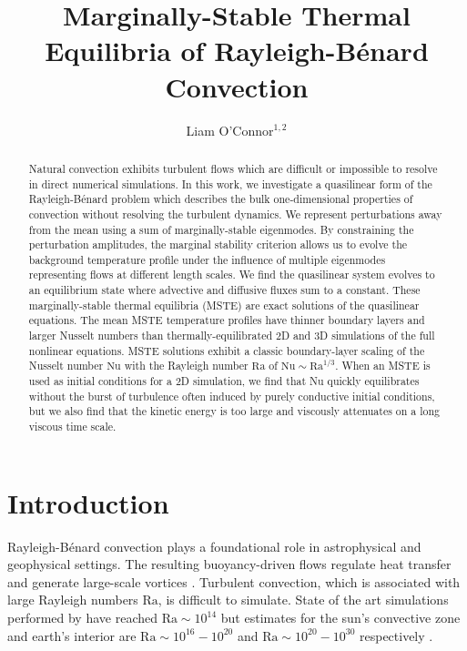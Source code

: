 \documentclass[longbibliography,twocolumn,amsmath,amssymb,aps,nofootinbib]{revtex4-2}
\newcommand\Ra{\mathrm{Ra}}
\newcommand\Nu{\mathrm{Nu}}
\begin{document}
\title{Marginally-Stable Thermal Equilibria of Rayleigh-B\'enard Convection}

\author{Liam O'Connor$^{1,2}$}

\begin{abstract}
    Natural convection exhibits turbulent flows which are difficult or impossible to resolve in direct numerical simulations. In this work, we investigate a quasilinear form of the Rayleigh-B\'enard problem which describes the bulk one-dimensional properties of convection without resolving the turbulent dynamics. We represent perturbations away from the mean using a sum of marginally-stable eigenmodes.  By constraining the perturbation amplitudes, the marginal stability criterion allows us to evolve the background temperature profile under the influence of multiple eigenmodes representing flows at different length scales.
    We find the quasilinear system evolves to an equilibrium state where advective and diffusive fluxes sum to a constant.
    These marginally-stable thermal equilibria (MSTE) are exact solutions of the quasilinear equations.
    The mean MSTE temperature profiles have thinner boundary layers and larger Nusselt numbers than thermally-equilibrated 2D and 3D simulations of the full nonlinear equations.  
    MSTE solutions exhibit a classic boundary-layer scaling of the Nusselt number $\Nu$ with the Rayleigh number $\Ra$ of $\Nu \sim \Ra^{1/3}$.
    When an MSTE is used as initial conditions for a 2D simulation, we find that Nu quickly equilibrates without the burst of turbulence often induced by purely conductive initial conditions, but we also find that the kinetic energy is too large and viscously attenuates on a long viscous time scale.
\end{abstract}

\maketitle

\section{Introduction}
Rayleigh-B\'enard convection plays a foundational role in astrophysical and geophysical settings.
The resulting buoyancy-driven flows regulate heat transfer and generate large-scale vortices \cite{Couston}.
Turbulent convection, which is associated with large Rayleigh numbers $\Ra$, is difficult to simulate. 
State of the art simulations performed by \cite{Zhu_2018} have reached $\Ra \sim 10^{14}$ but estimates for the sun's convective zone and earth's interior are $\Ra \sim 10^{16}-10^{20}$ and $\Ra \sim 10^{20}-10^{30}$ respectively \cite{Ossendrijver,Gubbins_2001}. 



\end{document}
